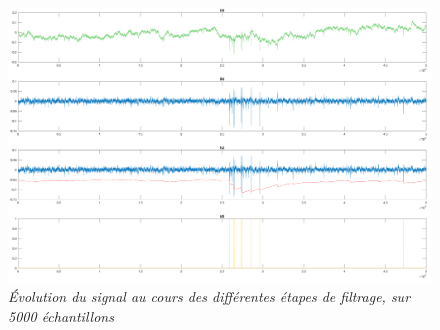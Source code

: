 \documentclass[a4paper,12pt]{article}
\begin{document}
\begin{figure}[H]
\centering
\includegraphics[scale=0.18, keepaspectratio]{toto2.png}
\caption{\textit{Évolution du signal au cours des différentes étapes de filtrage, sur 5000 échantillons}}
\end{figure}
\end{document}
